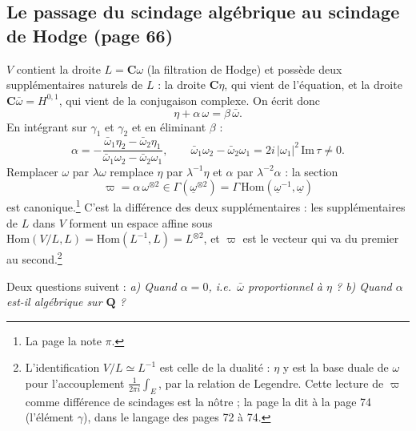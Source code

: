 \documentclass[11pt,a4paper]{article}
\begin{document}
\subsection*{Le passage du scindage algébrique au scindage de Hodge (page 66)}

$V$ contient la droite $L = \mathbf{C}\omega$ (la filtration de Hodge) et
possède deux supplémentaires naturels de $L$ : la droite $\mathbf{C}\eta$, qui
vient de l'équation, et la droite $\mathbf{C}\bar\omega = H^{0,1}$, qui vient
de la conjugaison complexe. On écrit donc
\[
\eta + \alpha\,\omega = \beta\,\bar\omega .
\]
En intégrant sur $\gamma_1$ et $\gamma_2$ et en éliminant $\beta$ :
\[
\alpha = -\frac{\bar\omega_1\eta_2 - \bar\omega_2\eta_1}
{\bar\omega_1\omega_2 - \bar\omega_2\omega_1},
\qquad
\bar\omega_1\omega_2 - \bar\omega_2\omega_1 = 2i\,|\omega_1|^2\,\mathrm{Im}\,\tau
\neq 0 .
\]
Remplacer $\omega$ par $\lambda\omega$ remplace $\eta$ par $\lambda^{-1}\eta$ et
$\alpha$ par $\lambda^{-2}\alpha$ : la section
\[
\varpi = \alpha\,\omega^{\otimes 2} \in \Gamma(\underline{\omega}^{\otimes 2})
= \Gamma\,\mathrm{Hom}(\underline{\omega}^{-1},\underline{\omega})
\]
est canonique.\footnote{La page la note $\pi$.} C'est la différence des deux
supplémentaires : les supplémentaires de $L$ dans $V$ forment un espace affine
sous $\mathrm{Hom}(V/L, L) = \mathrm{Hom}(L^{-1},L) = L^{\otimes 2}$, et
$\varpi$ est le vecteur qui va du premier au second.\footnote{L'identification
$V/L \simeq L^{-1}$ est celle de la dualité : $\eta$ y est la base duale de
$\omega$ pour l'accouplement $\tfrac{1}{2\pi i}\int_E$, par la relation de
Legendre. Cette lecture de $\varpi$ comme différence de scindages est la
nôtre ; la page la dit à la page 74 (l'élément $\gamma$), dans le langage des
pages 72 à 74.}

Deux questions suivent : \emph{a) Quand $\alpha = 0$, i.e.\ $\bar\omega$
proportionnel à $\eta$ ? b) Quand $\alpha$ est-il algébrique sur
$\mathbf{Q}$ ?}
\end{document}

